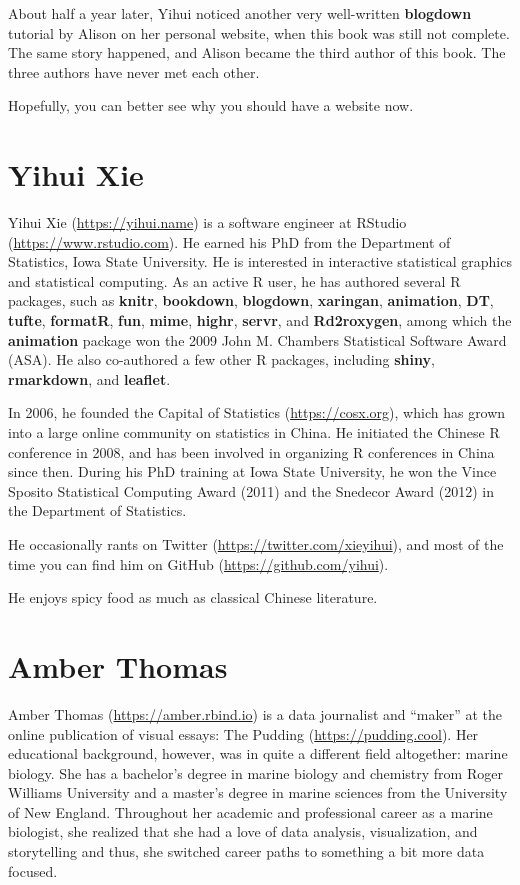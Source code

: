 \documentclass[12pt,]{krantz}
\theoremstyle{definition}
\theoremstyle{definition}
\theoremstyle{definition}
\theoremstyle{remark}
\begin{document}
About half a year later, Yihui noticed another very well-written
\textbf{blogdown} tutorial by Alison on her personal website, when this
book was still not complete. The same story happened, and Alison became
the third author of this book. The three authors have never met each
other.

Hopefully, you can better see why you should have a website now.

\section*{Yihui Xie}\label{yihui-xie}


Yihui Xie (\url{https://yihui.name}) is a software engineer at RStudio
(\url{https://www.rstudio.com}). He earned his PhD from the Department
of Statistics, Iowa State University. He is interested in interactive
statistical graphics and statistical computing. As an active R user, he
has authored several R packages, such as \textbf{knitr},
\textbf{bookdown}, \textbf{blogdown}, \textbf{xaringan},
\textbf{animation}, \textbf{DT}, \textbf{tufte}, \textbf{formatR},
\textbf{fun}, \textbf{mime}, \textbf{highr}, \textbf{servr}, and
\textbf{Rd2roxygen}, among which the \textbf{animation} package won the
2009 John M. Chambers Statistical Software Award (ASA). He also
co-authored a few other R packages, including \textbf{shiny},
\textbf{rmarkdown}, and \textbf{leaflet}.

In 2006, he founded the Capital of Statistics (\url{https://cosx.org}),
which has grown into a large online community on statistics in China. He
initiated the Chinese R conference in 2008, and has been involved in
organizing R conferences in China since then. During his PhD training at
Iowa State University, he won the Vince Sposito Statistical Computing
Award (2011) and the Snedecor Award (2012) in the Department of
Statistics.

He occasionally rants on Twitter (\url{https://twitter.com/xieyihui}),
and most of the time you can find him on GitHub
(\url{https://github.com/yihui}).

He enjoys spicy food as much as classical Chinese literature.

\section*{Amber Thomas}\label{amber-thomas}


Amber Thomas (\url{https://amber.rbind.io}) is a data journalist and
``maker'' at the online publication of visual essays: The Pudding
(\url{https://pudding.cool}). Her educational background, however, was
in quite a different field altogether: marine biology. She has a
bachelor's degree in marine biology and chemistry from Roger Williams
University and a master's degree in marine sciences from the University
of New England. Throughout her academic and professional career as a
marine biologist, she realized that she had a love of data analysis,
visualization, and storytelling and thus, she switched career paths to
something a bit more data focused.
\end{document}
